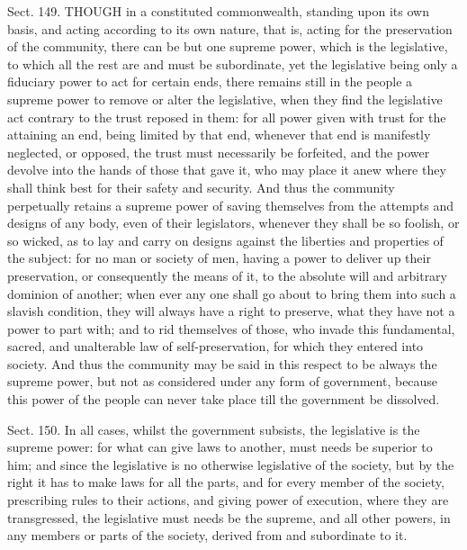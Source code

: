 \documentclass[11pt,openany]{book}
\begin{document}
Sect. 149. THOUGH in a constituted commonwealth, standing upon its own basis, and acting according to its own nature, that is, acting for the preservation of the community, there can be but one supreme power, which is the legislative, to which all the rest are and must be subordinate, yet the legislative being only a fiduciary power to act for certain ends, there remains still in the people a supreme power to remove or alter the legislative, when they find the legislative act contrary to the trust reposed in them: for all power given with trust for the attaining an end, being limited by that end, whenever that end is manifestly neglected, or opposed, the trust must necessarily be forfeited, and the power devolve into the hands of those that gave it, who may place it anew where they shall think best for their safety and security. And thus the community perpetually retains a supreme power of saving themselves from the attempts and designs of any body, even of their legislators, whenever they shall be so foolish, or so wicked, as to lay and carry on designs against the liberties and properties of the subject: for no man or society of men, having a power to deliver up their preservation, or consequently the means of it, to the absolute will and arbitrary dominion of another; when ever any one shall go about to bring them into such a slavish condition, they will always have a right to preserve, what they have not a power to part with; and to rid themselves of those, who invade this fundamental, sacred, and unalterable law of self-preservation, for which they entered into society. And thus the community may be said in this respect to be always the supreme power, but not as considered under any form of government, because this power of the people can never take place till the government be dissolved.

Sect. 150. In all cases, whilst the government subsists, the legislative is the supreme power: for what can give laws to another, must needs be superior to him; and since the legislative is no otherwise legislative of the society, but by the right it has to make laws for all the parts, and for every member of the society, prescribing rules to their actions, and giving power of execution, where they are transgressed, the legislative must needs be the supreme, and all other powers, in any members or parts of the society, derived from and subordinate to it.
\end{document}
